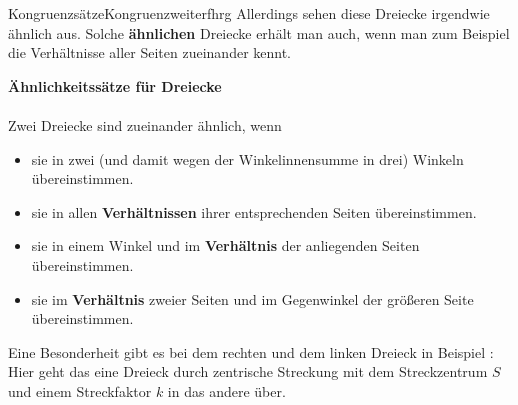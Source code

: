 \begin{MXContent}{Kongruenzs\"atze}{Kongruenz}{weiterfhrg}
Allerdings sehen diese Dreiecke irgendwie \"ahnlich aus. Solche \textbf{\"ahnlichen} Dreiecke erh\"alt man auch, wenn man zum Beispiel die Verh\"altnisse aller Seiten zueinander kennt.

\begin{MInfo}%
\textbf{\"Ahnlichkeitss\"atze f\"ur Dreiecke}\\
\ \\
Zwei Dreiecke sind zueinander \"ahnlich, wenn
\begin{itemize}
 \item	sie in zwei (und damit wegen der Winkelinnensumme in drei) Winkeln \"ubereinstimmen.
 \item  sie in allen \textbf{Verh\"altnissen} ihrer entsprechenden Seiten \"ubereinstimmen.
 \item  sie in einem Winkel und im \textbf{Verh\"altnis} der anliegenden Seiten \"ubereinstimmen.
 \item  sie im \textbf{Verh\"altnis} zweier Seiten und im Gegenwinkel der gr\"o\ss eren Seite \"ubereinstimmen.
\end{itemize}
\end{MInfo}

Eine Besonderheit gibt es bei dem rechten und dem linken Dreieck in Beispiel  : Hier geht das eine Dreieck durch zentrische Streckung  mit dem Streckzentrum $S$ und einem Streckfaktor $k$ in das andere \"uber.
\begin{center}
\end{center}


\end{MXContent}
